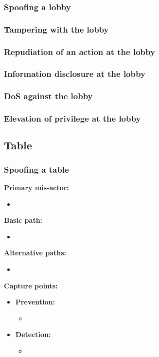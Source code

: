 \documentclass[a4paper,11pt]{report}
\begin{document}
\subsubsection{Spoofing a lobby}
\subsubsection{Tampering with the lobby}
\subsubsection{Repudiation of an action at the lobby}
\subsubsection{Information disclosure at the lobby}
\subsubsection{DoS against the lobby}
\subsubsection{Elevation of privilege at the lobby}
\subsection{Table}
\subsubsection{Spoofing a table}
\textbf{Primary mis-actor:}
\begin{itemize}
\item 
\end{itemize}
\textbf{Basic path:}
\begin{itemize}
\item 
\end{itemize}
\textbf{Alternative paths:}
\begin{itemize}
\item 
\end{itemize}
\textbf{Capture points:}
\begin{itemize}
\item \textbf{Prevention:}
\begin{itemize}
\item 
\end{itemize}
\item \textbf{Detection:}
\begin{itemize}
\item 
\end{itemize}
\end{itemize}
\end{document}
